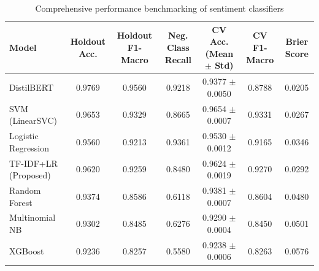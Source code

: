 \documentclass[authoryear,review,3p,times,12pt]{elsarticle}
\begin{document}
\begin{landscape}
\begin{table}
\centering
\renewcommand{\arraystretch}{1.15}
\caption{Comprehensive performance benchmarking of sentiment classifiers}
\label{tab:model_benchmarking}
\begin{tabular}{lcccccc}
\hline
\textbf{Model} & \textbf{Holdout Acc.} & \textbf{Holdout F1-Macro} & \textbf{Neg. Class Recall} & \textbf{CV Acc. (Mean $\pm$ Std)} & \textbf{CV F1-Macro} & \textbf{Brier Score} \\ \hline
DistilBERT & 0.9769 & 0.9560 & 0.9218 & 0.9377 $\pm$ 0.0050 & 0.8788 & 0.0205 \\
SVM (LinearSVC) & 0.9653 & 0.9329 & 0.8665 & 0.9654 $\pm$ 0.0007 & 0.9331 & 0.0267 \\
Logistic Regression & 0.9560 & 0.9213 & 0.9361 & 0.9530 $\pm$ 0.0012 & 0.9165 & 0.0346 \\
TF-IDF+LR (Proposed) & 0.9620 & 0.9259 & 0.8480 &0.9624 $\pm$ 0.0019 & 0.9270 & 0.0292 \\
Random Forest & 0.9374 & 0.8586 & 0.6118 & 0.9381 $\pm$ 0.0007 & 0.8604 & 0.0480 \\
Multinomial NB & 0.9302 & 0.8485 & 0.6276 & 0.9290 $\pm$ 0.0004 & 0.8450 & 0.0501 \\
XGBoost & 0.9236 & 0.8257 & 0.5580 & 0.9238 $\pm$ 0.0006 & 0.8263 & 0.0576 \\ \hline
\end{tabular}
\end{table}
\end{landscape}
\end{document}
